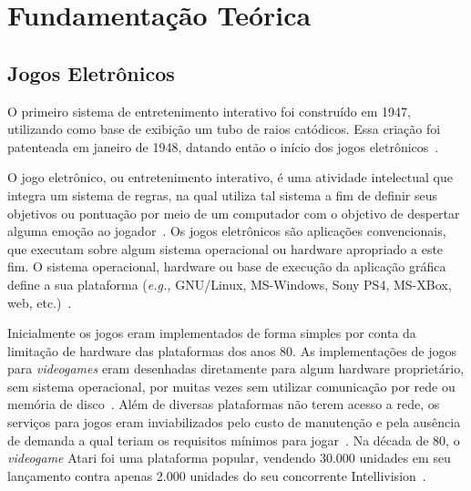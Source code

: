 \chapter{Fundamentação Teórica}
\label{cap2}



\section{Jogos Eletrônicos}



O primeiro sistema de entretenimento interativo foi construído em 1947, utilizando como base de exibição um tubo de raios catódicos.
%
Essa criação foi patenteada em janeiro de 1948, datando então o início dos jogos eletrônicos~\cite{Adams2014Jan, patents1947Jan}.



O jogo eletrônico, ou entretenimento interativo, é uma atividade intelectual que integra um sistema de regras, na qual utiliza tal sistema a fim de definir seus objetivos ou pontuação por meio de um computador com o objetivo de despertar alguma emoção ao jogador~\cite{video_game_technologies}.
%
Os jogos eletrônicos são aplicações convencionais, que executam sobre algum sistema operacional ou hardware apropriado a este fim.
%
O sistema operacional, hardware ou base de execução da aplicação gráfica define a sua plataforma (\textit{e.g.,} GNU/Linux, MS-Windows, Sony PS4, MS-XBox, web, etc.)~\cite{adams_1208533}.



Inicialmente os jogos eram implementados de forma simples por conta da limitação de hardware das plataformas dos anos 80.
%
As implementações de jogos para \textit{videogames} eram desenhadas diretamente para algum hardware proprietário, sem sistema operacional, por muitas vezes sem utilizar comunicação por rede ou memória de disco~\cite{rollings2003andrew}.
%
Além de diversas plataformas não terem acesso a rede, os serviços para jogos eram inviabilizados pelo custo de manutenção e pela ausência de demanda a qual teriam os requisitos mínimos para jogar~\cite{adams_1208533}.
%
Na década de 80, o \textit{videogame} Atari foi uma plataforma popular, vendendo 30.000 unidades em seu lançamento contra apenas 2.000 unidades do seu concorrente Intellivision~\cite{atari_age}.



